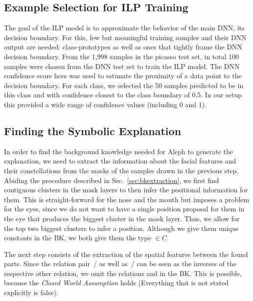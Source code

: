 \subsection{Example Selection for ILP Training}
The goal of the ILP model is to approximate the behavior of the main
DNN, \idest its decision boundary.
For this, few but meaningful training samples and their DNN output
are needed: class-prototypes as well as ones that tightly frame the
DNN decision boundary.
From the 1,998 samples in the picasso test set, in total 100 samples
were chosen from the DNN test set to train the ILP model.
The DNN confidence score here was used to estimate
the proximity of a data point to the decision boundary.
For each class, we selected the 50 samples predicted to be in this
class and with confidence closest to the class boundary of 0.5.
In our setup this provided a wide range of confidence values
(including 0 and 1).

\subsection{Finding the Symbolic Explanation}
In order to find the background knowledge needed for Aleph to generate
the explanation, we need to extract the information about the facial
features and their constellations from the masks of the samples drawn in the
previous step. Abiding the procedure described in
Sec.~\ref{sec:bkextraction}, we first find contiguous clusters in the
mask layers to then infer the positional information for them. This is
straight-forward for the nose and the mouth but imposes a problem for
the eyes, since we do not want to have a single position proposal for
them in the eye that produces the biggest cluster in the mask
layer. Thus, we allow for the top two biggest clusters to infer a
position. Although we give them unique constants in the BK, we both
give them the type  $\in C$.

The next step consists of the extraction of the spatial features
between the found parts. Since the relation pair
\,/  as well as
\,/  can be seen as the inverses of
the respective other relation, we omit the relations
 and  in the BK. This is
possible, because the \emph{Closed World Assumption} holds (Everything
that is not stated explicitly is false).

